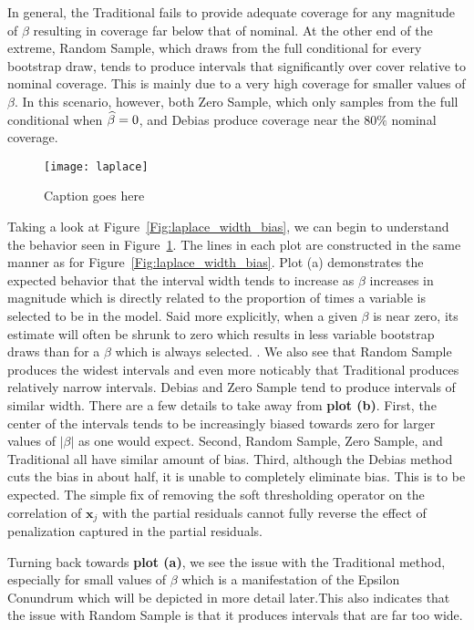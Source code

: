 In general, the Traditional fails to provide adequate coverage for any magnitude of $\beta$ resulting in coverage far below that of nominal. At the other end of the extreme, Random Sample, which draws from the full conditional for every bootstrap draw, tends to produce intervals that significantly over cover relative to nominal coverage. This is mainly due to a very high coverage for smaller values of $\beta$. In this scenario, however, both Zero Sample, which only samples from the full conditional when $\widehat{\beta} = 0$, and Debias produce coverage near the $80\%$ nominal coverage.

\begin{figure}
  \texttt{[image: laplace]}
  \caption{\label{Fig:laplace} Caption goes here}
\end{figure}


Taking a look at Figure~\ref{Fig:laplace_width_bias}, we can begin to understand the behavior seen in Figure~\ref{Fig:laplace}. The lines in each plot are constructed in the same manner as for Figure~\ref{Fig:laplace_width_bias}. Plot (a) demonstrates the expected behavior that the interval width tends to increase as $\beta$ increases in magnitude which is directly related to the proportion of times a variable is selected to be in the model. Said more explicitly, when a given $\beta$ is near zero, its estimate will often be shrunk to zero which results in less variable bootstrap draws than for a $\beta$ which is always selected. . We also see that Random Sample produces the widest intervals and even more noticably that Traditional produces relatively narrow intervals. Debias and Zero Sample tend to produce intervals of similar width. There are a few details to take away from \textbf{plot (b)}. First, the center of the intervals tends to be increasingly biased towards zero for larger values of $|\beta|$ as one would expect. Second, Random Sample, Zero Sample, and Traditional all have similar amount of bias. Third, although the Debias method cuts the bias in about half, it is unable to completely eliminate bias. This is to be expected. The simple fix of removing the soft thresholding operator on the correlation of $\boldsymbol{x}_j$ with the partial residuals cannot fully reverse the effect of penalization captured in the partial residuals.

Turning back towards \textbf{plot (a)}, we see the issue with the Traditional method, especially for small values of $\beta$ which is a manifestation of the Epsilon Conundrum which will be depicted in more detail later.This also indicates that the issue with Random Sample is that it produces intervals that are far too wide.

